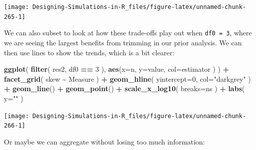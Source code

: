 \documentclass[
]{book}
\newenvironment{Shaded}{\begin{snugshade}}{\end{snugshade}}
\newcommand{\AttributeTok}[1]{\textcolor[rgb]{0.13,0.29,0.53}{#1}}
\newcommand{\DecValTok}[1]{\textcolor[rgb]{0.00,0.00,0.81}{#1}}
\newcommand{\FunctionTok}[1]{\textcolor[rgb]{0.13,0.29,0.53}{\textbf{#1}}}
\newcommand{\NormalTok}[1]{#1}
\newcommand{\SpecialCharTok}[1]{\textcolor[rgb]{0.81,0.36,0.00}{\textbf{#1}}}
\newcommand{\StringTok}[1]{\textcolor[rgb]{0.31,0.60,0.02}{#1}}
\begin{document}
\begin{center}\texttt{[image: Designing-Simulations-in-R\_files/figure-latex/unnamed-chunk-265-1]} \end{center}

We can also subset to look at how these trade-offs play out when \texttt{df0\ =\ 3}, where we are seeing the largest benefits from trimming in our prior analysis.
We can then use lines to show the trends, which is a bit clearer:

\begin{Shaded}
\begin{Highlighting}[]
\FunctionTok{ggplot}\NormalTok{( }\FunctionTok{filter}\NormalTok{( res2, df0 }\SpecialCharTok{==} \DecValTok{3}\NormalTok{ ), }
        \FunctionTok{aes}\NormalTok{(}\AttributeTok{x=}\NormalTok{n, }\AttributeTok{y=}\NormalTok{value, }\AttributeTok{col=}\NormalTok{estimator ) ) }\SpecialCharTok{+}
    \FunctionTok{facet\_grid}\NormalTok{( skew }\SpecialCharTok{\textasciitilde{}}\NormalTok{ Measure ) }\SpecialCharTok{+}
    \FunctionTok{geom\_hline}\NormalTok{( }\AttributeTok{yintercept=}\DecValTok{0}\NormalTok{, }\AttributeTok{col=}\StringTok{"darkgrey"}\NormalTok{ ) }\SpecialCharTok{+}
    \FunctionTok{geom\_line}\NormalTok{() }\SpecialCharTok{+} \FunctionTok{geom\_point}\NormalTok{() }\SpecialCharTok{+}
    \FunctionTok{scale\_x\_log10}\NormalTok{( }\AttributeTok{breaks=}\NormalTok{ns ) }\SpecialCharTok{+}
    \FunctionTok{labs}\NormalTok{( }\AttributeTok{y=}\StringTok{""}\NormalTok{ )}
\end{Highlighting}
\end{Shaded}

\begin{center}\texttt{[image: Designing-Simulations-in-R\_files/figure-latex/unnamed-chunk-266-1]} \end{center}

Or maybe we can aggregate without losing too much information:
\end{document}
